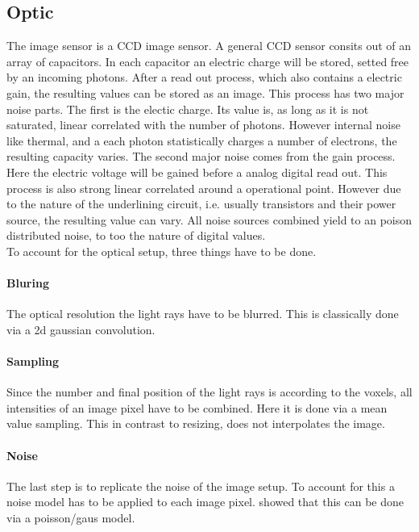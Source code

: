 \subsection{Optic}
\label{sec:ccdOptic}
% 
The image sensor is a \ac{CCD} image sensor.
A general \ac{CCD} sensor consits out of an array of capacitors.
In each capacitor an electric charge will be stored, setted free by an incoming photons.
After a read out process, which also contains a electric gain, the resulting values can be stored as an image.
This process has two major noise parts. The first is the electic charge.
Its value is, as long as it is not saturated, linear correlated with the number of photons.
However internal noise like thermal, and a each photon statistically charges a number of electrons, the resulting capacity varies.
The second major noise comes from the gain process.
Here the electric voltage will be gained before a analog digital read out.
This process is also strong linear correlated around a operational point.
However due to the nature of the underlining circuit, i.e. usually transistors and their power source, the resulting value can vary.
All noise sources combined yield to an poison distributed noise, to too the nature of digital values.
%
\\
%
To account for the optical setup, three things have to be done.
\paragraph{Bluring}
The optical resolution the light rays have to be blurred.
This is classically done via a 2d gaussian convolution.
\paragraph{Sampling}
Since the number and final position of the light rays is according to the voxels, all intensities of an image pixel have to be combined.
Here it is done via a mean value sampling.
This in contrast to resizing, does not interpolates the image.
% 
\paragraph{Noise}
The last step is to replicate the noise of the image setup. To account for this a noise model has to be applied to each image pixel. \cite{Wiese:887678} showed that this can be done via a poisson/gaus model.
% 
